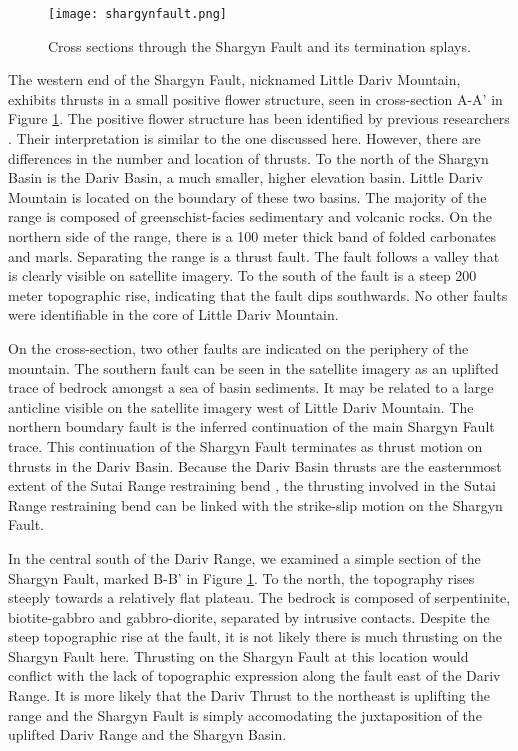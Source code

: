 \begin{figure}[h!]
  \centering
  \texttt{[image: shargynfault.png]}
  \caption{Cross sections through the Shargyn Fault and its termination splays.}
  \label{shargynfaultxsecs}
\end{figure}
\clearpage
The western end of the Shargyn Fault, nicknamed Little Dariv Mountain, exhibits thrusts in a small positive flower structure, seen in cross-section A-A' in Figure \ref{shargynfaultxsecs}. The positive flower structure has been identified by previous researchers \citep{Howard2006}. Their interpretation is similar to the one discussed here. However, there are differences in the number and location of thrusts. To the north of the Shargyn Basin is the Dariv Basin, a much smaller, higher elevation basin. Little Dariv Mountain is located on the boundary of these two basins. The majority of the range is composed of greenschist-facies sedimentary and volcanic rocks. On the northern side of the range, there is a 100 meter thick band of folded carbonates and marls. Separating the range is a thrust fault. The fault follows a valley that is clearly visible on satellite imagery. To the south of the fault is a steep 200 meter topographic rise, indicating that the fault dips southwards. No other faults were identifiable in the core of Little Dariv Mountain. 

On the cross-section, two other faults are indicated on the periphery of the mountain. The southern fault can be seen in the satellite imagery as an uplifted trace of bedrock amongst a sea of basin sediments. It may be related to a large anticline visible on the satellite imagery west of Little Dariv Mountain. The northern boundary fault is the inferred continuation of the main Shargyn Fault trace.  This continuation of the Shargyn Fault terminates as thrust motion on thrusts in the Dariv Basin. Because the Dariv Basin thrusts are the easternmost extent of the Sutai Range restraining bend \citep{Cunningham2003}, the thrusting involved in the Sutai Range restraining bend can be linked with the strike-slip motion on the Shargyn Fault. 

In the central south of the Dariv Range, we examined a simple section of the Shargyn Fault, marked B-B' in Figure \ref{shargynfaultxsecs}. To the north, the topography rises steeply towards a relatively flat plateau. The bedrock is composed of serpentinite, biotite-gabbro and gabbro-diorite, separated by intrusive contacts. Despite the steep topographic rise at the fault, it is not likely there is much thrusting on the Shargyn Fault here. Thrusting on the Shargyn Fault at this location would conflict with the lack of topographic expression along the fault east of the Dariv Range. It is more likely that the Dariv Thrust to the northeast is uplifting the range and the Shargyn Fault is simply accomodating the juxtaposition of the uplifted Dariv Range and the Shargyn Basin. 

